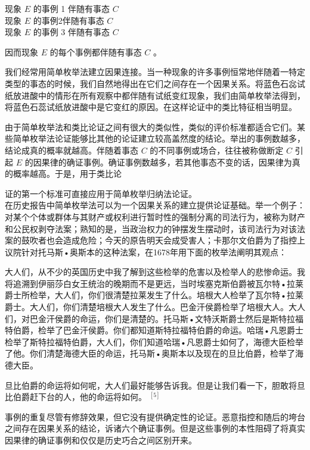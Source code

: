 \begin{displayquote}
现象 $E$ 的事例 1 伴随有事态 $C$\\
现象 $E$ 的事例2伴随有事态 $C$\\
现象 $E$ 的事例 3 伴随有事态 $C$
\end{displayquote}

因而现象 $E$ 的每个事例都伴随有事态 $C$ 。

我们经常用简单枚举法建立因果连接。当一种现象的许多事例恒常地伴随着一特定类型的事态的时候，我们自然地得出在它们之间存在一个因果关系。将蓝色石惢试纸放进酸中的情形在所有观察中都伴随有试纸变红现象，我们由简单枚举法得到，将蓝色石蕊试纸放进酸中是它变红的原因。在这样论证中的类比特征相当明显。

由于简单枚举法和类比论证之间有很大的类似性，类似的评价标准都适合它们。某些简单枚举法论证能够比其他的论证建立较高盖然度的结论。举出的事例数越多，结论成真的概率就越高。伴随着事态 $C$ 的不同事例或场合，往往被称做断定 $C$ 引起 $E$ 的因果律的确证事例。确证事例数越多，若其他事态不变的话，因果律为真的概率越高。于是，用于类比论

证的第一个标准可直接应用于简单枚举归纳法论证。\\
在历史报告中简单枚举法可以为一个因果关系的建立提供论证基础。举一个例子：对某个个体或群体与其财产或权利进行暂时性的强制分离的司法行为，被称为财产和公民权剥夺法案；熟知的是，当政治权力的钟摆发生摆动时，该司法行为对该法案的鼓吹者也会造成危险；今天的原告明天会成受害人；卡那尔文伯爵为了指控上议院针对托马斯•奥斯本的这种法案，在1678年用下面的枚举法阐明其观点：

大人们，从不少的英国历史中我了解到这些检举的危害以及检举人的悲惨命运。我将追溯到伊丽莎白女王统治的晚期而不是更远，当时埃塞克斯伯爵被瓦尔特•拉莱爵士所检举，大人们，你们很清楚拉莱发生了什么。培根大人检举了瓦尔特•拉莱爵士。大人们，你们清楚培根大人发生了什么。巴金汗侯爵检举了培根大人。大人们，对巴金汗侯爵的命运，你们是清楚的。托马斯•文特沃斯爵士然后是斯特拉福特伯爵，检举了巴金汗侯爵。你们都知道斯特拉福特伯爵的命运。哈瑞•凡恩爵士检举了斯特拉福特伯爵，大人们，你们知道哈瑞•凡恩爵士如何了，海德大臣检举了他。你们清楚海德大臣的命运，托马斯•奥斯本以及现在的旦比伯爵，检举了海德大臣。

旦比伯爵的命运将如何呢，大人们最好能够告诉我。但是让我们看一下，胆敢将旦比伯爵赶下台的人，他的命运将如何。 ${ }^{[5]}$

事例的重复尽管有修辞效果，但它没有提供确定性的论证。恶意指控和随后的垮台之间存在因果关系的结论，诉诸六个确证事例。但是这些事例的本性阻碍了将真实因果律的确证事例和仅仅是历史巧合之间区别开来。

